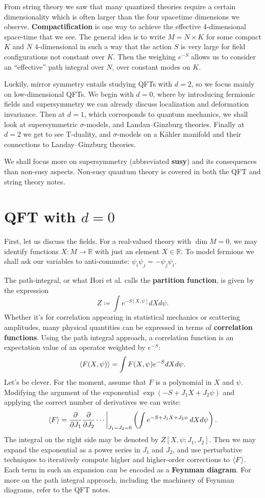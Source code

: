 \documentclass{report}
\theoremstyle{plain}
\theoremstyle{definition}
\theoremstyle{remark}
\newcommand{\di}{\partial}
\newcommand{\bR}{\mathbb{R}}
\newcommand{\sg}{\sigma}
\newcommand{\FR}[2]{\frac{#1}{#2}}
\begin{document}
From string theory we saw that many quantized theories require a
certain dimensionality which is often larger than the four spacetime
dimensions we observe. {\bf Compactification} is one way to achieve
the effective 4-dimensional space-time that we see. The general idea
is to write $M = N \times K$ for some compact $K$ and $N$
$4$-dimensional in such a way that the action $S$ is very large for
field configurations not constant over $K$. Then the weighing $e^{-S}$
allows us to consider an ``effective'' path integral over $N$, over
constant modes on $K$.

Luckily, mirror symmetry entails studying QFTs with $d=2$, so we focus
mainly on low-dimensional QFTs. We begin with $d=0$, where by
introducing fermionic fields and supersymmetry we can already discuss
localization and deformation invariance. Then at $d=1$, which
corresponds to quantum mechanics, we shall look at supersymmetric
$\sg$-models, and Landau--Ginzburg theories. Finally at $d=2$ we get
to see T-duality, and $\sg$-models on a K\"ahler manifold and their
connections to Landay--Ginzburg theories.

We shall focus more on supersymmetry (abbreviated {\bf susy}) and its
consequences than non-susy aspects. Non-susy quantum theory is covered
in both the QFT and string theory notes.

\section{QFT with \texorpdfstring{$d=0$}{d=0}}
First, let us discuss the fields. For a real-valued theory with $\dim
M=0$, we may identify functions $X:M\to\bR$ with just an element
$X\in\bR$. To model fermions we shall ask our variables to
anti-commute: $\psi_i\psi_j=-\psi_j\psi_i$.

The path-integral, or what Hori et al. calls the \textbf{partition
function}, is given by the expression \[Z \coloneqq \int e^{-S[X,\psi]}dX
d\psi.\] Whether it's for correlation appearing in statistical mechanics or
scattering amplitudes, many physical quantities can be expressed in terms
of \textbf{correlation functions}. Using the path integral approach, a
correlation function is an expectation value of an operator weighted by
$e^{-S}$: \[\braket{F(X,\psi)} = \int F(X,\psi) e^{-S}  dXd\psi.\] Let's be
clever. For the moment, assume that $F$ is a polynomial in $X$ and $\psi$.
Modifying the argument of the exponential $\exp(-S + J_1X+J_2\psi)$ and
applying the correct number of derivatives we can write:
\[ \braket{F} = \FR{\di}{\di J_1}\FR{\di}{\di J_2}\cdots
\biggr|_{J_1=J_2=0} \left(\int e^{-S+J_1X+J_2\psi}\, dXd\psi\right). \]
The integral on the right side may be denoted by $Z[X,\psi;J_1,J_2]$.
Then we may expand the exponential as a power series in $J_1$ and
$J_2$, and use perturbative techniques to iteratively compute higher
and higher-order corrections to $\braket{F}$. Each term in such an
expansion can be encoded as a {\bf Feynman diagram}. For more on the
path integral approach, including the machinery of Feynman diagrams,
refer to the QFT notes.
\end{document}
